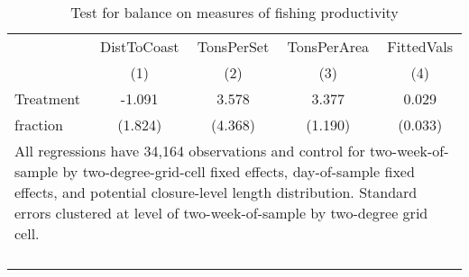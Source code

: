\begin{table}[tb]
\centering
\caption{Test for balance on measures of fishing productivity} 
\label{balance}
\begin{tabular}{lcccc}
   \toprule   & DistToCoast & TonsPerSet & TonsPerArea & FittedVals \\ 
   & (1) & (2) & (3) & (4) \\ 
   \midrule Treatment & -1.091 & 3.578 & 3.377 & 0.029 \\ 
  fraction & (1.824) & (4.368) & (1.190) & (0.033) \\ 
   \bottomrule \multicolumn{5}{l}{\multirow{2}{12.4cm}{All regressions have 34,164 observations and control for two-week-of-sample by two-degree-grid-cell fixed effects, day-of-sample fixed effects, and potential closure-level length distribution. Standard errors clustered at level of two-week-of-sample by two-degree grid cell.}} \\\\\\\\\\\\ \end{tabular}
\end{table}

